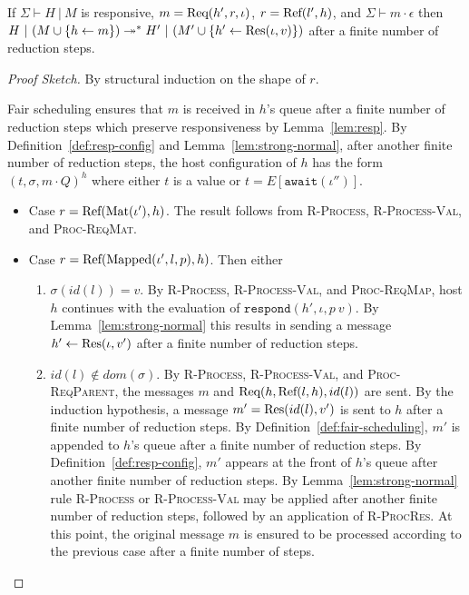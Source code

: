 \begin{thm}\label{thm:finite-mat}
  If $\Sigma \vdash H~|~M$ is responsive, $m = {\textrm{Req}(h', r, \iota)}$, $r = {\textrm{Ref}(l', h)}$,
  and $\Sigma \vdash m \cdot \epsilon$ then
  $H~|~(M \cup \{ h \leftarrow m \}) \twoheadrightarrow^* H'~|~(M' \cup \{ h' \leftarrow {\textrm{Res}(\iota, v)} \})$
  after a finite number of reduction steps.
\end{thm}
\begin{proof}[Proof Sketch]
  By structural induction on the shape of $r$.
  
  Fair scheduling ensures that $m$ is received in $h$'s queue after a
  finite number of reduction steps which preserve responsiveness by
  Lemma~\ref{lem:resp}. By Definition~\ref{def:resp-config} and
  Lemma~\ref{lem:strong-normal}, after another finite number of
  reduction steps, the host configuration of $h$ has the form $(t,
  \sigma, m \cdot Q)^h$ where either $t$ is a value or $t =
  E[\texttt{await}(\iota'')]$.

  \begin{itemize}
    \item Case $r = {\textrm{Ref}(\textrm{Mat}(\iota'), h)}$. The result follows from
      \textsc{R-Process}, \textsc{R-Process-Val}, and
      \textsc{Proc-ReqMat}.

    \item Case $r = {\textrm{Ref}(\textrm{Mapped}(\iota', l, p), h)}$. Then either
      \begin{enumerate}
        \item $\sigma(id(l)) = v$. By \textsc{R-Process},
          \textsc{R-Process-Val}, and \textsc{Proc-ReqMap}, host $h$
          continues with the evaluation of $\texttt{respond}(h',
          \iota, p~v)$. By Lemma~\ref{lem:strong-normal} this results
          in sending a message $h' \leftarrow {\textrm{Res}(\iota, v')}$ after a
          finite number of reduction steps.

        \item $id(l) \notin dom(\sigma)$. By \textsc{R-Process},
          \textsc{R-Process-Val}, and \textsc{Proc-ReqParent}, the
          messages $m$ and ${\textrm{Req}(h, \textrm{Ref}(l, h), id(l))}$ are sent. By
          the induction hypothesis, a message $m' = {\textrm{Res}(id(l), v')}$ is sent to $h$ after a finite number of reduction
          steps. By Definition~\ref{def:fair-scheduling}, $m'$ is
          appended to $h$'s queue after a finite number of reduction
          steps. By Definition~\ref{def:resp-config}, $m'$ appears at
          the front of $h$'s queue after another finite number of
          reduction steps. By Lemma~\ref{lem:strong-normal} rule
          \textsc{R-Process} or \textsc{R-Process-Val} may be applied
          after another finite number of reduction steps, followed by
          an application of \textsc{R-ProcRes}. At this point, the
          original message $m$ is ensured to be processed according to
          the previous case after a finite number of steps.
      \end{enumerate}


\end{itemize}
\end{proof}
